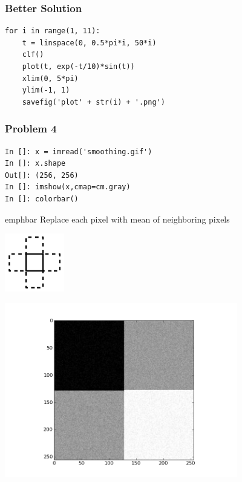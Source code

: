 \documentclass[14pt,compress]{beamer}
\newcommand{\emphbar}[1]
{\begin{beamercolorbox}[rounded=true]{emphbar}
      {#1}
 \end{beamercolorbox}
}
\begin{document}
\begin{frame}[fragile]
  \frametitle{Better Solution}
\begin{lstlisting}
for i in range(1, 11):
    t = linspace(0, 0.5*pi*i, 50*i)
    clf()
    plot(t, exp(-t/10)*sin(t))
    xlim(0, 5*pi)
    ylim(-1, 1)
    savefig('plot' + str(i) + '.png')
\end{lstlisting}
\end{frame}


\begin{frame}[fragile]
  \frametitle{Problem 4}
  \begin{lstlisting}
In []: x = imread('smoothing.gif')
In []: x.shape
Out[]: (256, 256)
In []: imshow(x,cmap=cm.gray)
In []: colorbar()
\end{lstlisting}
\emphbar{Replace each pixel with mean of neighboring pixels}
  \begin{center}
  \includegraphics[height=1in, interpolate=true]{data/exercises/neighbour}
  \end{center}
\end{frame}

\begin{frame}
  \begin{center}
    \includegraphics[height=3in, interpolate=true]{data/exercises/smoothing}
  \end{center}
\end{frame}
\end{document}
